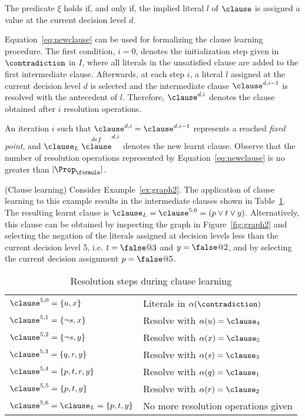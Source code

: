 The predicate $\xi$ holds if, and only if, the implied literal $l$ of $\clause$
is assigned a value at the current decision level $d$.   

Equation~\ref{eq:newclause} can be used for formalizing the clause learning
procedure. The first condition, $i = 0$, denotes the initialization step given
in $\contradiction$ in $I$, where all literals in the unsatisfied clause are added to
the first intermediate clause. Afterwards, at each step $i$, a literal $l$
assigned at the current decision level $d$ is selected and the intermediate
clause $\clause^{d, i-1}$ is resolved with the antecedent of $l$. Therefore,
$\clause^{d,i}$ denotes the clause obtained after $i$ resolution operations.

An iteration $i$ such that $\clause^{d, i} = \clause^{d, i-1}$ represents a
reached \emph{fixed point}, and $\clause_L \stackrel{def} \clause^{d, i}$
denotes the new learnt clause. Observe that the number of resolution
operations represented by Equation~\ref{eq:newclause} is no greater than
$|\Prop_\formula|$.

\begin{example}%
\label{ex:cl}
    (Clause learning)
    Consider Example~\ref{ex:graph2}. The application of clause learning to this
    example results in the intermediate clauses shown in Table~\ref{tab:cl}. The
    resulting learnt clause is $\clause_L = \clause^{5,6} = (p \lor t \lor y)$.
    Alternatively, this clause can be obtained by inspecting the graph in
    Figure~\ref{fig:graph2} and selecting the negation of the literals assigned
    at decision levels less than the current decision level 5, i.e. $t = \false
    @3$ and $y = \false @ 2$, and by selecting the current decision assignment
    $p = \false @5$.

\begin{table}%
\centering
\caption{Resolution steps during clause learning}
    \begin{tabular}{ll}
        \toprule
        $\clause^{5,0} = \{ u, x\}$ & Literals in $\alpha(\contradiction)$ \\
        $\clause^{5,1} = \{ \neg s, x\}$ & Resolve with $\alpha(u) = \clause_4$ \\
        $\clause^{5,2} = \{ \neg s, y\}$ & Resolve with $\alpha(x) = \clause_5$ \\
        $\clause^{5,3} = \{ q, r, y\}$ & Resolve with $\alpha(s) = \clause_3$ \\
        $\clause^{5,4} = \{ p, t, r, y\}$ & Resolve with $\alpha(q) = \clause_1$ \\
        $\clause^{5,5} = \{ p, t, y\}$ & Resolve with $\alpha(r) = \clause_2$ \\
        $\clause^{5,6} = \clause_L = \{ p, t, y\}$ & No more resolution operations given \\
        \toprule
    \end{tabular}%
\label{tab:cl}
\end{table}
\end{example}

